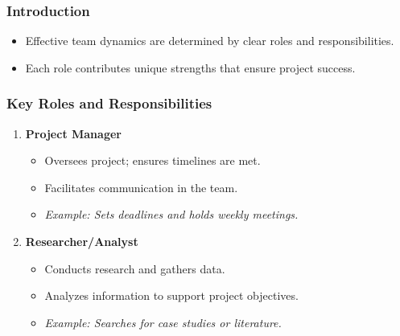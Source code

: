 \documentclass[aspectratio=169]{beamer}
\begin{document}
\begin{frame}[fragile]
    \frametitle{Introduction}
    \begin{itemize}
        \item Effective team dynamics are determined by clear roles and responsibilities.
        \item Each role contributes unique strengths that ensure project success.
    \end{itemize}
\end{frame}

\begin{frame}[fragile]
    \frametitle{Key Roles and Responsibilities}
    \begin{enumerate}
        \item \textbf{Project Manager}
            \begin{itemize}
                \item Oversees project; ensures timelines are met.
                \item Facilitates communication in the team.
                \item \textit{Example: Sets deadlines and holds weekly meetings.}
            \end{itemize}

        \item \textbf{Researcher/Analyst}
            \begin{itemize}
                \item Conducts research and gathers data.
                \item Analyzes information to support project objectives.
                \item \textit{Example: Searches for case studies or literature.}
            \end{itemize}
    \end{enumerate}
\end{frame}
\end{document}
